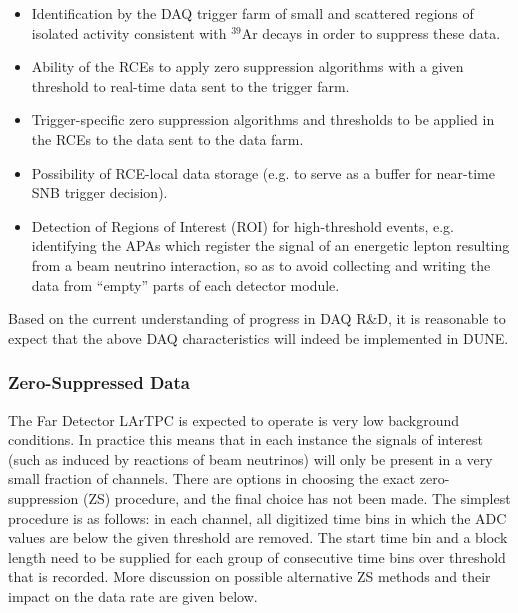 \begin{itemize}

\item Identification by the DAQ trigger farm of small and scattered regions of isolated activity
  consistent with $^{39}$Ar decays in order to suppress these data.

\item Ability of the RCEs to apply zero suppression algorithms
with a given threshold to real-time data sent to the trigger farm.

\item Trigger-specific zero suppression algorithms and thresholds to be applied
in the RCEs to the data sent to the data farm.

\item Possibility of RCE-local data storage (e.g. to serve as a buffer for near-time SNB trigger decision).

\item Detection of Regions of Interest (ROI) for high-threshold events, e.g. identifying the APAs
which register the signal of an energetic lepton resulting from a beam neutrino interaction, so as
to avoid collecting and writing the data from ``empty'' parts of each detector module.

\end{itemize}

\noindent
Based on the current understanding of progress in DAQ R\&D, it is reasonable to expect 
that the above DAQ characteristics will indeed be implemented in DUNE.



\subsubsection{Zero-Suppressed Data}
\label{sec:zs-data}
The Far Detector LArTPC is expected to operate is very low background conditions. In practice
this means that in each instance the signals of interest (such as induced by reactions of beam neutrinos)
will only be present in a very small fraction of channels. There are options in choosing the exact zero-suppression (ZS)
procedure, and the final choice has not been made. The simplest procedure is
as follows: in each channel, all digitized time bins in which the ADC values are below the given threshold
are removed.  The start time bin and a block length need to be supplied for each group of consecutive time bins over threshold
that is recorded.  More discussion on possible alternative ZS methods and their impact on the data rate are given below.

